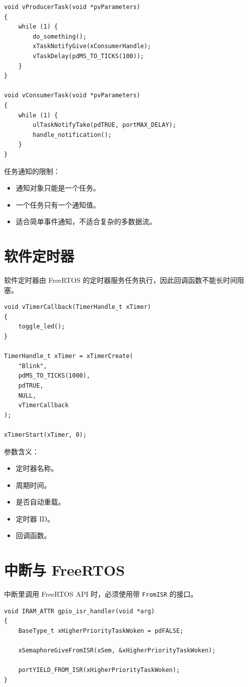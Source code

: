 \documentclass[12pt,a4paper]{ctexart}
\begin{document}
\begin{lstlisting}
void vProducerTask(void *pvParameters)
{
    while (1) {
        do_something();
        xTaskNotifyGive(xConsumerHandle);
        vTaskDelay(pdMS_TO_TICKS(100));
    }
}

void vConsumerTask(void *pvParameters)
{
    while (1) {
        ulTaskNotifyTake(pdTRUE, portMAX_DELAY);
        handle_notification();
    }
}
\end{lstlisting}

任务通知的限制：

\begin{itemize}
    \item 通知对象只能是一个任务。
    \item 一个任务只有一个通知值。
    \item 适合简单事件通知，不适合复杂的多数据流。
\end{itemize}

\section{软件定时器}

软件定时器由 FreeRTOS 的定时器服务任务执行，因此回调函数不能长时间阻塞。

\begin{lstlisting}
void vTimerCallback(TimerHandle_t xTimer)
{
    toggle_led();
}

TimerHandle_t xTimer = xTimerCreate(
    "Blink",
    pdMS_TO_TICKS(1000),
    pdTRUE,
    NULL,
    vTimerCallback
);

xTimerStart(xTimer, 0);
\end{lstlisting}

参数含义：

\begin{itemize}
    \item 定时器名称。
    \item 周期时间。
    \item 是否自动重载。
    \item 定时器 ID。
    \item 回调函数。
\end{itemize}

\section{中断与 FreeRTOS}

中断里调用 FreeRTOS API 时，必须使用带 \texttt{FromISR} 的接口。

\begin{lstlisting}
void IRAM_ATTR gpio_isr_handler(void *arg)
{
    BaseType_t xHigherPriorityTaskWoken = pdFALSE;

    xSemaphoreGiveFromISR(xSem, &xHigherPriorityTaskWoken);

    portYIELD_FROM_ISR(xHigherPriorityTaskWoken);
}
\end{lstlisting}
\end{document}
